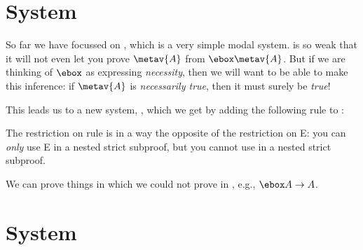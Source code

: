 \section{System \mlT}
\label{T}

So far we have focussed on \mlK, which is a very simple modal system. \mlK{} is so weak that it will not even let you prove $\metav{A}$ from $\ebox\metav{A}$. But if we are thinking of $\ebox$ as expressing \emph{necessity}, then we will want to be able to make this inference: if $\metav{A}$ is \emph{necessarily true}, then it must surely be \emph{true}!

This leads us to a new system,  \mlT, which we get by adding the following rule to \mlK:

The restriction on rule \mlT{} is in a way the opposite of the restriction on \ebox E: you can \emph{only} use \ebox E in a nested strict subproof, but you cannot use \mlT{} in a nested strict subproof.

We can prove things in \mlT{} which we could not prove in \mlK, e.g., $\ebox A \eif A$.

\section{System \mlSfour}
\label{S4}


